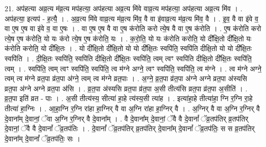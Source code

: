 \documentclass[17pt]{extarticle}
\begin{document}
21. अप॑हत्या अव्र॒त्य म॑व्र॒त्य मप॑हत्या॒ अप॑हत्या अव्र॒त्य मि॑वे वाव्र॒त्य मप॑हत्या॒ अप॑हत्या अव्र॒त्य मि॑व । . अप॑हत्या॒ इत्यप॑ - ह॒त्यै॒ । . अ॒व्र॒त्य मि॑वे वाव्र॒त्य म॑व्र॒त्य मि॑व॒ वै वा इ॑वाव्र॒त्य म॑व्र॒त्य मि॑व॒ वै । . इ॒व॒ वै वा इ॑वे व॒ वा ए॒ष ए॒ष वा इ॑वे व॒ वा ए॒षः । . वा ए॒ष ए॒ष वै वा ए॒ष क॑रोति करो त्ये॒ष वै वा ए॒ष क॑रोति । . ए॒ष क॑रोति करो त्ये॒ष ए॒ष क॑रोति॒ यो यः क॑रो त्ये॒ष ए॒ष क॑रोति॒ यः । . क॒रो॒ति॒ यो यः क॑रोति करोति॒ यो दी᳚क्षि॒तो दी᳚क्षि॒तो यः क॑रोति करोति॒ यो दी᳚क्षि॒तः । . यो दी᳚क्षि॒तो दी᳚क्षि॒तो यो यो दी᳚क्षि॒तः स्वपि॑ति॒ स्वपि॑ति दीक्षि॒तो यो यो दी᳚क्षि॒तः स्वपि॑ति । . दी॒क्षि॒तः स्वपि॑ति॒ स्वपि॑ति दीक्षि॒तो दी᳚क्षि॒तः स्वपि॑ति॒ त्वम् त्वꣳ स्वपि॑ति दीक्षि॒तो दी᳚क्षि॒तः स्वपि॑ति॒ त्वम् । . स्वपि॑ति॒ त्वम् त्वꣳ स्वपि॑ति॒ स्वपि॑ति॒ त्व म॑ग्ने अग्ने॒ त्वꣳ स्वपि॑ति॒ स्वपि॑ति॒ त्व म॑ग्ने । . त्व म॑ग्ने अग्ने॒ त्वम् त्व म॑ग्ने व्रत॒पा व्र॑त॒पा अ॑ग्ने॒ त्वम् त्व म॑ग्ने व्रत॒पाः । . अ॒ग्ने॒ व्र॒त॒पा व्र॑त॒पा अ॑ग्ने अग्ने व्रत॒पा अ॑स्यसि व्रत॒पा अ॑ग्ने अग्ने व्रत॒पा अ॑सि । . व्र॒त॒पा अ॑स्यसि व्रत॒पा व्र॑त॒पा अ॒सी तीत्य॑सि व्रत॒पा व्र॑त॒पा अ॒सीति॑ । . व्र॒त॒पा इति॑ व्रत - पाः । . अ॒सी तीत्य॑स्य॒ सीत्या॑ हा॒हे त्य॑स्य॒सी त्या॑ह । . इत्या॑हा॒हे तीत्या॑हा॒ ग्नि र॒ग्नि रा॒हे तीत्या॑ हा॒ग्निः । . आ॒हा॒ग्नि र॒ग्नि रा॑हा हा॒ग्निर् वै वा अ॒ग्नि रा॑हा हा॒ग्निर् वै । . अ॒ग्निर् वै वा अ॒ग्नि र॒ग्निर् वै दे॒वाना᳚म् दे॒वानां॒ ॅवा अ॒ग्नि र॒ग्निर् वै दे॒वाना᳚म् । . वै दे॒वाना᳚म् दे॒वानां॒ ॅवै वै दे॒वानां᳚ ॅव्र॒तप॑तिर् व्र॒तप॑तिर् दे॒वानां॒ ॅवै वै दे॒वानां᳚ ॅव्र॒तप॑तिः । . दे॒वानां᳚ ॅव्र॒तप॑तिर् व्र॒तप॑तिर् दे॒वाना᳚म् दे॒वानां᳚ ॅव्र॒तप॑तिः॒ स स व्र॒तप॑तिर् दे॒वाना᳚म् दे॒वानां᳚ ॅव्र॒तप॑तिः॒ सः । \newline
\end{document}
